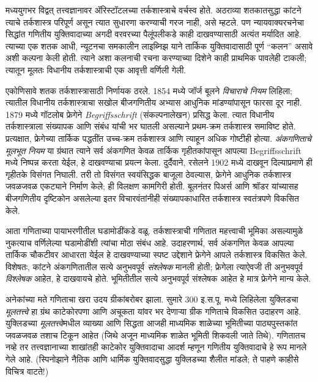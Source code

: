 मध्ययुगभर विद्वत् तत्त्वज्ञानावर ॲरिस्टॉटलच्या तर्कशास्त्राचे वर्चस्व होते.
अठराव्या शतकातसुद्धा कांटने त्याचे तर्कशास्त्र परिपूर्ण असून त्यात सुधारणा
करण्याची गरज नाही, असे म्हटले. पण न्यायवाक्यरचनेचा सिद्धांत गणितीय
युक्तिवादाच्या अगदी वरवरच्या पैलूंपलीकडे काही दाखवण्यासाठी अत्यंत मर्यादित
आहे. त्याच्या एक शतक आधी, न्यूटनचा समकालीन लाइब्निझ याने तार्किक
युक्तिवादासाठी पूर्ण ``कलन'' असावे अशी कल्पना केली होती. त्याने अशा कलनाची
रचना करण्याच्या दिशेने काही प्राथमिक पावलेही टाकली; त्यातून मूलतः विधानीय
तर्कशास्त्राची एक आवृत्ती वर्णिली गेली.

एकोणिसावे शतक तर्कशास्त्रासाठी निर्णायक ठरले. 1854 मध्ये जॉर्ज बूलने
\emph{विचाराचे नियम} लिहिला; त्यातील विधानीय तर्कशास्त्राचा सखोल बीजगणितीय
अभ्यास आधुनिक मांडण्यांपासून फारसा दूर नाही. 1879 मध्ये गॉटलोब फ्रेगेने
\emph{Begriffsschrift} (संकल्पनालेखन) प्रसिद्ध केला. त्यात विधानीय
तर्कशास्त्राला संख्यापक आणि संबंध यांची भर घातली असल्याने प्रथम-क्रम
तर्कशास्त्र समाविष्ट होते. प्रत्यक्षात, फ्रेगेच्या तार्किक पद्धतींत
उच्च-क्रम तर्कशास्त्र आणि त्याहून अधिक गोष्टीही होत्या. \emph{अंकगणिताचे
  मूलभूत नियम} या ग्रंथात त्याने सर्व अंकगणित केवळ तार्किक गृहीतकांपासून
आपल्या Begriffsschrift मध्ये निष्पन्न करता येईल, हे दाखवण्याचा प्रयत्न
केला. दुर्दैवाने, रसेलने 1902 मध्ये दाखवून दिल्याप्रमाणे ही गृहीतके
विसंगत निघाली. तरी तो विसंगत स्वयंसिद्धक बाजूला ठेवल्यास, फ्रेगेने आधुनिक
तर्कशास्त्र जवळजवळ एकट्याने निर्माण केले; ही विलक्षण कामगिरी होती.
बूलनंतर पिअर्स आणि श्रॉडर यांच्यासह बीजगणितीय दृष्टिकोन असलेल्या इतर
विचारवंतांनीही संख्यापकाधारित तर्कशास्त्र स्वतंत्रपणे विकसित केले.

आता गणिताच्या पायाभरणीतील घडामोडींकडे वळू. तर्कशास्त्राची गणितात महत्त्वाची
भूमिका असल्यामुळे नुकत्याच वर्णिलेल्या घडामोडींशी त्यांचा मोठा संबंध आहे.
उदाहरणार्थ, सर्व अंकगणित केवळ आपल्या तार्किक चौकटीवर आधारता येईल हे
दाखवण्याच्या स्पष्ट उद्देशाने फ्रेगेने आपले तर्कशास्त्र विकसित केले.
विशेषतः, कांटने अंकगणितातील सत्ये अनुभवपूर्व \emph{संश्लेषक} मानली होती;
फ्रेगेला त्याऐवजी ती अनुभवपूर्व \emph{विश्लेषक} आहेत, हे दाखवायचे होते.
भूमितीतील सत्ये अनुभवपूर्व संश्लेषक आहेत हे मात्र फ्रेगेने मान्य केले.


अनेकांच्या मते गणिताचा खरा उदय ग्रीकांबरोबर झाला. सुमारे 300 इ.स.पू.
मध्ये लिहिलेला युक्लिडचा \emph{मूलतत्त्वे} हा ग्रंथ काटेकोरपणा आणि
अचूकता यांवर भर देणाऱ्या ग्रीक गणिताचे विकसित उदाहरण आहे. युक्लिडच्या
\emph{मूलतत्त्वे}मधील व्याख्या आणि सिद्धता आजही माध्यमिक शाळेच्या
भूमितीच्या पाठ्यपुस्तकांत जवळजवळ तशाच टिकून आहेत (जिथे अजून माध्यमिक
शाळेत भूमिती शिकवली जाते तिथे). गणितातच नव्हे तर तत्त्वज्ञानाच्या
शाखांतही काटेकोर युक्तिवादाचा आदर्श म्हणून गणितीय युक्तिवादाचे हे रूप
मानले गेले आहे. (स्पिनोझाने नैतिक आणि धार्मिक युक्तिवादसुद्धा
युक्लिडच्या शैलीत मांडले; ते पाहणे काहीसे विचित्र वाटते!)

